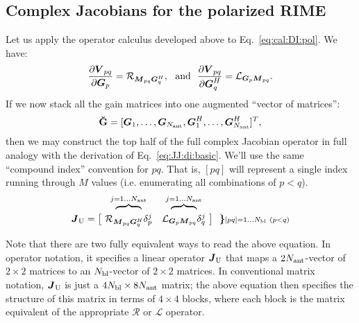 \documentclass[useAMS,usenatbib]{mn2e}
\newcommand{\mat}[1]{{\bmath{#1}}}
\newcommand{\JJ}{\mat{J}} %
\newcommand{\MM}{\mat{M}}
\newcommand{\VV}{\mat{V}}
\newcommand{\GG}{\mat{G}}
\newcommand{\AUGx}[1]{\mathbf{\breve{#1}}}
\newcommand{\GGg}{\AUGx{G}}
\newcommand{\TOP}{\mathrm{U}}%
\newcommand{\Rop}[1]{\mathcal{R}_{{#1}}}
\newcommand{\Lop}[1]{\mathcal{L}_{{#1}}}
\numberwithin{equation}{section}
\begin{document}
\subsection{Complex Jacobians for the polarized RIME}

Let us apply the operator calculus developed above to Eq.~\ref{eq:cal:DI:pol}. We have:
\begin{equation}
\label{eq:dR:dG}
\frac{\partial\VV_{pq}}{\partial\GG_p} = \Rop{\MM_{pq}\GG^H_q},\mathrm{~~and~~}
\frac{\partial\VV_{pq}}{\partial\GG^H_q} = \Lop{\GG_p \MM_{pq}}.
\end{equation}
If we now stack all the gain matrices into one augmented ``vector of matrices'':
\begin{equation}
\label{eq:GGvec}
\GGg = [ \GG_1,\dots,\GG_{\scriptstyle \Na},\GG^H_1,\dots,\GG^H_{\scriptstyle \Na} ]^T,
\end{equation}
then we may construct the top half of the full complex Jacobian operator in full analogy with the 
derivation of Eq.~\ref{eq:JJ:di:basic}. We'll use the same ``compound index'' convention for $pq$. That is, 
$[pq]$ will represent a single index running through $M$ values (i.e. enumerating all combinations of $p<q$).
\begin{equation}
\label{eq:JJtop}
\begin{array}{r@{~}cc@{~}cc}
  & \overbrace{~~~~~~~~}^{j=1\dots \Na} & \overbrace{~~~~~~~~}^{j=1\dots \Na} \\

\JJ_\TOP = \big [ & 
\Rop{ \MM_{pq}\GG^H_q }\delta^j_p & 
\Lop{ \GG_p \MM_{pq}  }\delta^j_q 
& \big ] ~~ \bm{\}} \scriptstyle [pq]=1\dots \Nbl~(p<q)
% 
\end{array}
\end{equation}

Note that there are two fully equivalent ways to read the above equation. In operator notation, it specifies a linear 
operator $\JJ_\TOP$ that maps a $2N_\mathrm{ant}$-vector of $2\times2$ matrices to an $N_\mathrm{bl}$-vector of $2\times2$ matrices. In
conventional matrix notation, 
$\JJ_\TOP$ is just a $4N_\mathrm{bl}\times8N_\mathrm{ant}$ matrix; the above equation then specifies the structure of this matrix in terms
of $4\times4$ blocks, where each block is the matrix equivalent of the appropriate $\mathcal{R}$ or $\mathcal{L}$ operator.
\end{document}
